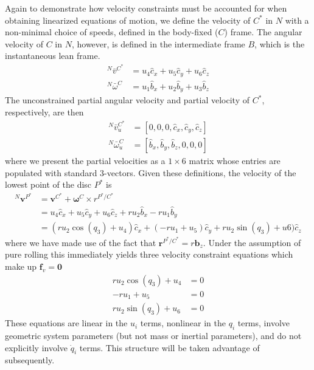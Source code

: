 \documentclass[smallcondensed,final]{svjour3}                     %
\begin{document}
Again to demonstrate how velocity constraints must be accounted for when
obtaining linearized equations of motion, we define the velocity of $C^*$ in
$N$ with a non-minimal choice of speeds, defined in the body-fixed ($C$) frame.
The angular velocity of $C$ in $N$, however, is defined in the intermediate
frame $B$, which is the instantaneous lean frame.
\begin{align}
  \label{v_u}
  {^N}\bar{v}^{C^*} &= u_4 \hat{c}_x + u_5 \hat{c}_y + u_6 \hat{c}_z \\
  \label{w_u}
  {^N}\bar{\omega}^C &= u_1 \hat{b}_x + u_2 \hat{b}_y + u_3 \hat{b}_z
\end{align}
The unconstrained partial angular velocity and partial velocity of $C^*$,
respectively, are then
\begin{align}
  {^N}\bar{v}^{C^*}_u &= [0, 0, 0, \hat{c}_x, \hat{c}_y, \hat{c}_z] \\
  {^N}\bar{\omega}^C_u &= [\hat{b}_x, \hat{b}_y, \hat{b}_z, 0, 0, 0]
\end{align}
where we present the partial velocities as a $1\times6$ matrix whose entries
are populated with standard 3-vectors. Given these definitions, the velocity of
the lowest point of the disc $P^*$ is
\begin{align*}
    {^N}\bm{v}^{P^*} &= \bm{v}^{C^*} + \bm{\omega}^{C} \times r^{P^*/C^*} \\
                     &= u_4\hat{c}_x + u_5\hat{c}_y + u_6\hat{c}_z + r u_2
                        \hat{b}_x - r u_1 \hat{b}_y \\
                     &= (r u_2 \cos(q_3) + u_4) \hat{c}_x + (-r
                        u_1 + u_5)\hat{c}_y + r u_2 \sin(q_3) +
                        u6) \hat{c}_z
\end{align*}
where we have made use of the fact that $\bm{r}^{P^*/C^*} = r\bm{b}_z$.
Under the assumption of pure rolling this immediately yields three velocity
constraint equations which make up $\mathbf{f}_v = \mathbf{0}$
\begin{subequations}
\label{rd:f_v}
\begin{align}
    r u_2 \cos(q_3) + u_4 &= 0\\
            -r u_1 + u_5 &= 0\\
    r u_2 \sin(q_3) + u_6 &= 0
\end{align}
\end{subequations}
These equations are linear in the $u_i$ terms, nonlinear in the $q_i$ terms,
involve geometric system parameters (but not mass or inertial parameters), and
do not explicitly involve $\dot{q}_i$ terms. This structure will be taken
advantage of subsequently.
\end{document}
